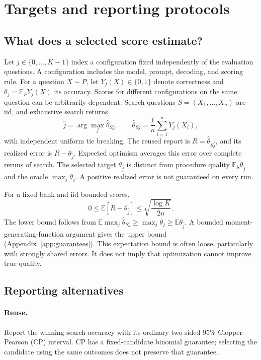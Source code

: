 \section{Targets and reporting protocols}
\label{sec:methods}
\subsection{What does a selected score estimate?}
Let $j\in\{0,\ldots,K-1\}$ index a configuration fixed independently of the evaluation questions. A configuration includes the model, prompt, decoding, and scoring rule. For a question $X\sim P$, let $Y_j(X)\in\{0,1\}$ denote correctness and $\theta_j=\mathbb{E}_P Y_j(X)$ its accuracy. Scores for different configurations on the same question can be arbitrarily dependent. Search questions $S=(X_1,\ldots,X_n)$ are iid, and exhaustive search returns
\begin{equation}
 \hat j=\arg\max_j\hat\theta_{Sj},\qquad
 \hat\theta_{Sj}=\frac1n\sum_{i=1}^nY_j(X_i),
\end{equation}
with independent uniform tie breaking. The reused report is $R=\hat\theta_{S\hat j}$, and its realized error is $R-\theta_{\hat j}$. Expected optimism averages this error over complete reruns of search. The selected target $\theta_{\hat j}$ is distinct from procedure quality $\mathbb{E}_S\theta_{\hat j}$ and the oracle $\max_j\theta_j$. A positive realized error is not guaranteed on every run.

For a fixed bank and iid bounded scores,
\begin{equation}
 0\leq\mathbb{E}[R-\theta_{\hat j}]
 \leq\sqrt{\frac{\log K}{2n}}.
 \label{eq:optimism}
\end{equation}
The lower bound follows from $\mathbb{E}\max_j\hat\theta_{Sj}\geq\max_j\theta_j\geq\mathbb{E}\theta_{\hat j}$. A bounded moment-generating-function argument gives the upper bound (Appendix~\ref{app:guarantees}). This expectation bound is often loose, particularly with strongly shared errors. It does not imply that optimization cannot improve true quality.

\subsection{Reporting alternatives}
\paragraph{Reuse.}
Report the winning search accuracy with its ordinary two-sided 95\% Clopper--Pearson (CP) interval. CP has a fixed-candidate binomial guarantee; selecting the candidate using the same outcomes does not preserve that guarantee.


